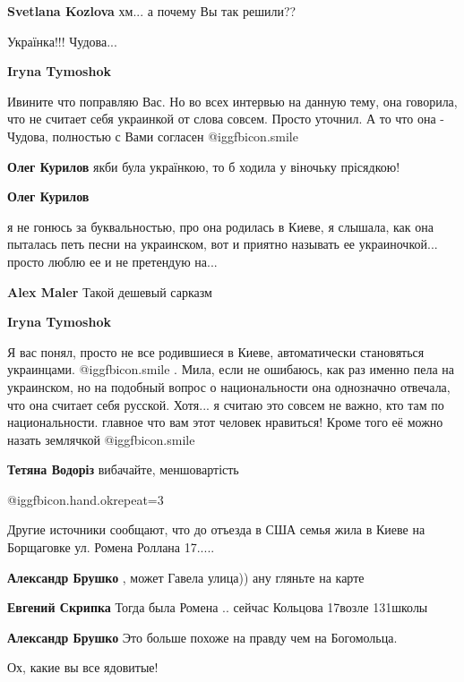 \begin{itemize}
\begin{itemize}
\begin{itemize}
\textbf{Svetlana Kozlova} хм... а почему Вы так решили??
\end{itemize} %

\end{itemize} %

Українка!!! Чудова...

\begin{itemize} %
\textbf{Iryna Tymoshok} 

Ивините что поправляю Вас. Но во всех интервью на данную тему, она говорила,
что не считает себя украинкой от слова совсем. Просто уточнил. А то что она -
Чудова, полностью с Вами согласен  @igg{fbicon.smile} 

\begin{itemize} %
\textbf{Олег Курилов} якби була українкою, то б ходила у віночьку прісядкою!

\textbf{Олег Курилов} 

я не гонюсь за буквальностью, про она родилась в Киеве, я слышала, как она
пыталась петь песни на украинском, вот и приятно называть ее
украиночкой... просто люблю ее и не претендую на...


\textbf{Alex Maler} Такой дешевый сарказм

\textbf{Iryna Tymoshok} 

Я вас понял, просто не все родившиеся в Киеве, автоматически становяться
украинцами.  @igg{fbicon.smile} . Мила, если не ошибаюсь, как раз именно пела на украинском, но
на подобный вопрос о национальности она однозначно отвечала, что она считает
себя русской. Хотя... я считаю это совсем не важно, кто там по национальности.
главное что вам этот человек нравиться! Кроме того её можно назать землячкой  @igg{fbicon.smile} 

\end{itemize} %

\textbf{Тетяна Водоріз} вибачайте, меншовартість

\end{itemize} %

 @igg{fbicon.hand.ok}{repeat=3} 


Другие источники сообщают, что до отъезда в США семья жила в Киеве на
Борщаговке ул. Ромена Роллана 17.....

\begin{itemize} %
\textbf{Александр Брушко} , может Гавела улица)) ану гляньте на карте

\textbf{Евгений Скрипка} Тогда была Ромена .. сейчас Кольцова 17возле 131школы

\textbf{Александр Брушко} Это больше похоже на правду чем на Богомольца.
\end{itemize} %

Ох, какие вы все ядовитые!




\end{itemize} %
